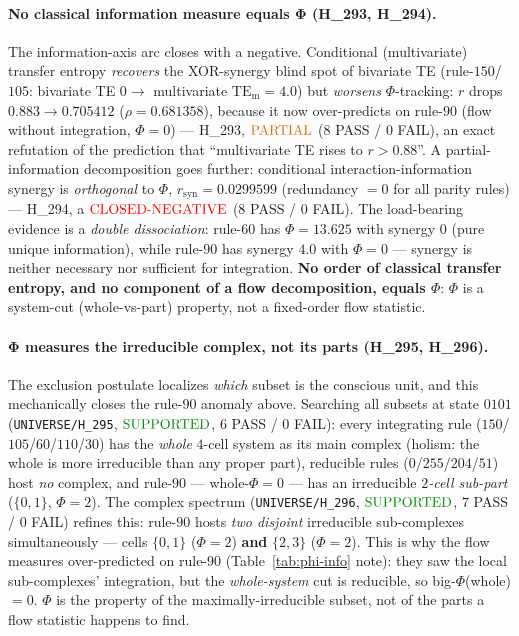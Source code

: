 \documentclass[11pt]{article}
\begin{document}
\paragraph{No classical information measure equals Φ (H\_293, H\_294).} The
information-axis arc closes with a negative. Conditional (multivariate) transfer
entropy \emph{recovers} the XOR-synergy blind spot of bivariate TE (rule-$150$/$105$:
bivariate TE $0\rightarrow$ multivariate $\mathrm{TE_m}=4.0$) but \emph{worsens}
$\Phi$-tracking: $r$ drops $0.883\rightarrow\mathbf{0.705412}$ ($\rho{=}0.681358$),
because it now over-predicts on rule-$90$ (flow without integration, $\Phi{=}0$) ---
H\_293, $\mathbf{\textcolor{orange!85!black}{\text{PARTIAL}}}$ ($8$ PASS / $0$ FAIL), an
exact refutation of the prediction that ``multivariate TE rises to $r{>}0.88$''. A
partial-information decomposition goes further: conditional interaction-information
synergy is \emph{orthogonal} to $\Phi$, $r_\text{syn}=\mathbf{0.0299599}$ (redundancy
$=0$ for all parity rules) --- H\_294, a $\mathbf{\textcolor{red}{\text{CLOSED-NEGATIVE}}}$
($8$ PASS / $0$ FAIL). The load-bearing evidence is a \emph{double dissociation}:
rule-$60$ has $\Phi{=}13.625$ with synergy $0$ (pure unique information), while rule-$90$
has synergy $4.0$ with $\Phi{=}0$ --- synergy is neither necessary nor sufficient for
integration. \textbf{No order of classical transfer entropy, and no component of a
flow decomposition, equals $\Phi$}: $\Phi$ is a system-cut (whole-vs-part) property,
not a fixed-order flow statistic.

\paragraph{Φ measures the irreducible complex, not its parts (H\_295, H\_296).} The
exclusion postulate localizes \emph{which} subset is the conscious unit, and this
mechanically closes the rule-$90$ anomaly above. Searching all subsets at state $0101$
(\texttt{UNIVERSE/H\_295}, $\mathbf{\textcolor{green!55!black}{\text{SUPPORTED}}}$, $6$
PASS / $0$ FAIL): every integrating rule ($150$/$105$/$60$/$110$/$30$) has the
\emph{whole} $4$-cell system as its main complex (holism: the whole is more irreducible
than any proper part), reducible rules ($0$/$255$/$204$/$51$) host \emph{no} complex,
and rule-$90$ --- whole-$\Phi{=}0$ --- has an irreducible \emph{$2$-cell sub-part}
($\{0,1\}$, $\Phi{=}2$). The complex spectrum (\texttt{UNIVERSE/H\_296},
$\mathbf{\textcolor{green!55!black}{\text{SUPPORTED}}}$, $7$ PASS / $0$ FAIL) refines
this: rule-$90$ hosts \emph{two disjoint} irreducible sub-complexes simultaneously ---
cells $\{0,1\}$ ($\Phi{=}2$) \textbf{and} $\{2,3\}$ ($\Phi{=}2$). This is why the flow
measures over-predicted on rule-$90$ (Table~\ref{tab:phi-info} note): they saw the
local sub-complexes' integration, but the \emph{whole-system} cut is reducible, so
big-$\Phi$(whole) $=0$. $\Phi$ is the property of the maximally-irreducible subset, not
of the parts a flow statistic happens to find.
\end{document}

